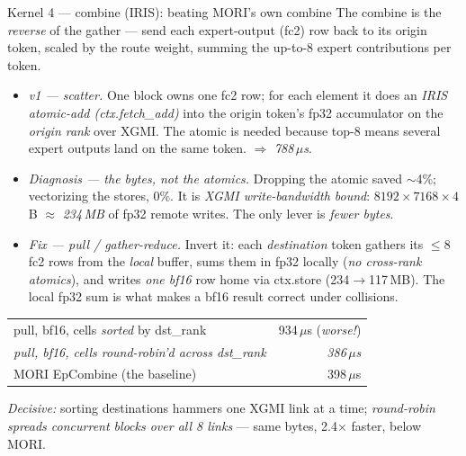 \documentclass[pdf,aspectratio=169]{beamer}
\newcommand{\empy}[1]{{\color{darkorange}\emph{#1}}}
\newcommand{\empr}[1]{{\color{cardinalred}\emph{#1}}}
\newcommand{\mc}[1]{{\ttfamily\small #1}}
\begin{document}
\begin{frame}{Kernel 4 --- \mc{combine} (IRIS): beating MORI's own combine}
\footnotesize
The combine is the \emph{reverse} of the gather --- send each expert-output (fc2) row back to its origin token, scaled by the route weight, summing the up-to-8 expert contributions per token.
\begin{itemize}\footnotesize
  \item \empr{v1 --- scatter.} One block owns one fc2 row; for each element it does an \empy{IRIS atomic-add (\mc{ctx.fetch\_add})} into the origin token's fp32 accumulator on the \emph{origin rank} over XGMI. The atomic is needed because top-8 means several expert outputs land on the same token. $\Rightarrow$ \empr{788\,$\mu$s}.
  \item \empr{Diagnosis --- the bytes, not the atomics.} Dropping the atomic saved $\sim$4\%; vectorizing the stores, 0\%. It is \empy{XGMI write-bandwidth bound}: $8192\times7168\times4$B $\approx$ \empy{234\,MB} of fp32 remote writes. The only lever is \emph{fewer bytes}.
  \item \empr{Fix --- pull / gather-reduce.} Invert it: each \emph{destination} token gathers its $\leq$8 fc2 rows from the \emph{local} buffer, sums them in fp32 locally (\empy{no cross-rank atomics}), and writes \emph{one bf16} row home via \mc{ctx.store} (234$\to$117\,MB). The local fp32 sum is what makes a bf16 result correct under collisions.
\end{itemize}
\vspace{-0.5ex}
\begin{center}\scriptsize
\begin{tabular}{lr}
pull, bf16, cells \emph{sorted} by dst\_rank & 934\,$\mu$s \;(\emph{worse!}) \\
\empy{pull, bf16, cells \emph{round-robin'd} across dst\_rank} & \empr{386\,$\mu$s} \\
MORI \mc{EpCombine} (the baseline) & 398\,$\mu$s \\
\end{tabular}
\end{center}
\empr{Decisive:} sorting destinations hammers one XGMI link at a time; \empy{round-robin spreads concurrent blocks over all 8 links} --- same bytes, 2.4$\times$ faster, below MORI.
\end{frame}
\end{document}
